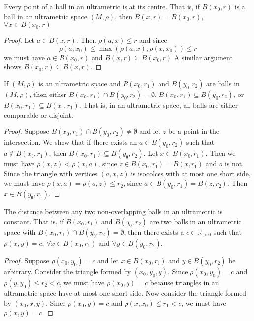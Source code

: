 \begin{proposition}
 Every point of a ball in an ultrametric is at its centre. That is, if $B(x_0, r)$ is a ball in an ultrametric space $(M,\rho)$, then $B(x, r)=B(x_0, r)$,  $\forall x \in B(x_0, r)$
\end{proposition}

\begin{proof}
Let $a \in B(x, r)$. Then $\rho(a,x) \leq r$ and since \[\rho(a,x_0) \leq \max(\rho(a,x), \rho(x,x_0)) \leq r\] we must have $a \in B(x_0, r)$ and  $B(x, r) \subseteq B(x_0, r)$ A similar argument shows $B(x_0, r) \subseteq B(x, r)$.
\end{proof}

\begin{proposition}
	If $(M, \rho)$ is an ultrametric space and $B(x_0, r_1)$ and $B(y_0, r_2)$ are balls in $(M, \rho)$, then either $B(x_0, r_1) \cap B(y_0, r_2) = \emptyset$, $B(x_0, r_1) \subseteq B(y_0, r_2)$, or $B(x_0, r_1) \subseteq B(x_0, r_1)$. That is, in an ultrametric space, all balls are either comparable or disjoint.
\end{proposition}

\begin{proof}
Suppose $B(x_0, r_1) \cap B(y_0, r_2) \neq \emptyset$ and let $z$ be a point in the intersection. We show that if there exists an $a \in B(y_0, r_2)$ such that $a \notin B(x_0,r_1)$, then $B(x_0, r_1) \subseteq B(y_0, r_2)$. Let $x \in B(x_0, r_1)$. Then we must have $\rho(x,z) < \rho(x,a)$, since $z \in B(x_0, r_1) = B(x,r_1)$ and $a$ is not. Since the triangle with vertices $(a,x,z)$ is isocolces with at most one short side, we must have $\rho(x,a) = \rho(a,z) \leq r_2$, since $a \in B(y_0, r_1) = B(z,r_2)$. Then $x \in B(y_0, r_1)$. 
\end{proof}

\begin{proposition}
 The distance between any two non-overlapping balls in an ultrametric is constant. That is, if $B(x_0, r_1)$ and $B(y_0, r_2)$ are two balls in an ultrametric space with $B(x_0, r_1) \cap B(y_0, r_2) = \emptyset$, then there exists a $c \in \mathbb{R}_{> 0}$ such that  $\rho(x,y)=c$, $\forall x \in B(x_0, r_1)$ and $\forall y \in B(y_0, r_2)$.
\end{proposition}

\begin{proof}
Suppose $\rho(x_0, y_0)=c$ and let $x \in B(x_0, r_1)$ and $y \in B(y_0, r_2)$ be arbitrary. Consider the triangle formed by $(x_0, y_0,y)$. Since $\rho(x_0,y_0)=c$ and  $\rho(y,y_0) \leq r_2 < c$, we must have $\rho(x_0, y)=c$ because triangles in an ultrametric space have at most one short side. Now consider the triangle formed by  $(x_0, x,y)$. Since $\rho(x_0, y)=c$ and  $\rho(x,x_0) \leq r_1 < c$, we must have $\rho(x, y)=c$.
\end{proof}

